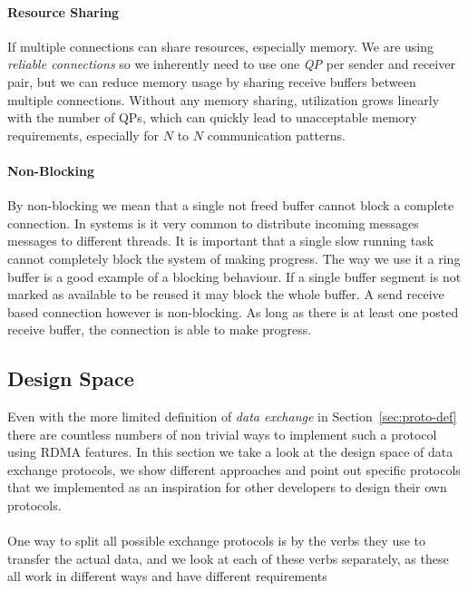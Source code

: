 \paragraph{Resource Sharing} If multiple connections can share resources, especially memory. We are using \emph{reliable connections}
so we inherently need to use one \emph{QP} per sender and receiver pair, but we can reduce memory usage by sharing receive 
buffers between multiple connections. Without any memory sharing, utilization grows linearly with the number of QPs, which 
can quickly lead to unacceptable memory requirements, especially for $N$ to $N$ communication patterns.

\paragraph{Non-Blocking} By non-blocking we mean that a single not freed buffer cannot block a complete connection. In systems
is it very common to distribute incoming messages messages to different threads. It is important that a single slow running 
task cannot completely block the system of making progress. The way we use it a ring buffer is a good example of a blocking
behaviour. If a single buffer segment is not marked as available to be reused it may block the whole buffer. A send receive 
based connection however is non-blocking. As long as there is at least one posted receive buffer, the connection is able to
make progress.




\subsection{Design Space} \label{sec:proto-ds}


Even with the more limited definition of \emph{data exchange} in Section~\ref{sec:proto-def} there are countless numbers
of non trivial ways to implement such a protocol using RDMA features. In this section we take a look at the design 
space of data exchange protocols, we show different approaches and point out specific protocols that we implemented
as an inspiration for other developers to design their own protocols.


\paragraph{} One way to split all possible exchange protocols is by the verbs they use to transfer the actual 
data, and we look at each of these verbs separately, as these all work in different ways and have different requirements

